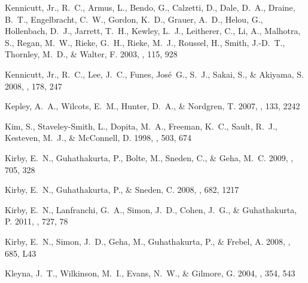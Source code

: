 \documentclass[manuscript]{aastex}
\begin{document}
\begin{thebibliography}{381}
{Kennicutt}, Jr., R.~C., {Armus}, L., {Bendo}, G., {Calzetti}, D., {Dale},
  D.~A., {Draine}, B.~T., {Engelbracht}, C.~W., {Gordon}, K.~D., {Grauer},
  A.~D., {Helou}, G., {Hollenbach}, D.~J., {Jarrett}, T.~H., {Kewley}, L.~J.,
  {Leitherer}, C., {Li}, A., {Malhotra}, S., {Regan}, M.~W., {Rieke}, G.~H.,
  {Rieke}, M.~J., {Roussel}, H., {Smith}, J.-D.~T., {Thornley}, M.~D., \&
  {Walter}, F. 2003, \pasp, 115, 928

{Kennicutt}, Jr., R.~C., {Lee}, J.~C., {Funes}, Jos{\'e}~G., S.~J., {Sakai},
  S., \& {Akiyama}, S. 2008, \apjs, 178, 247

{Kepley}, A.~A., {Wilcots}, E.~M., {Hunter}, D.~A., \& {Nordgren}, T. 2007,
  \aj, 133, 2242

{Kim}, S., {Staveley-Smith}, L., {Dopita}, M.~A., {Freeman}, K.~C., {Sault},
  R.~J., {Kesteven}, M.~J., \& {McConnell}, D. 1998, \apj, 503, 674

{Kirby}, E.~N., {Guhathakurta}, P., {Bolte}, M., {Sneden}, C., \& {Geha}, M.~C.
  2009, \apj, 705, 328

{Kirby}, E.~N., {Guhathakurta}, P., \& {Sneden}, C. 2008{}, \apj,
  682, 1217

{Kirby}, E.~N., {Lanfranchi}, G.~A., {Simon}, J.~D., {Cohen}, J.~G., \&
  {Guhathakurta}, P. 2011, \apj, 727, 78

{Kirby}, E.~N., {Simon}, J.~D., {Geha}, M., {Guhathakurta}, P., \& {Frebel}, A.
  2008{}, \apjl, 685, L43

{Kleyna}, J.~T., {Wilkinson}, M.~I., {Evans}, N.~W., \& {Gilmore}, G. 2004,
  \mnras, 354, 543


\end{thebibliography}
\end{document}
